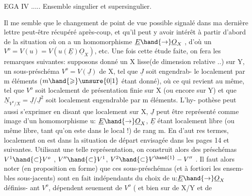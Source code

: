 
EGA IV ..... Ensemble singulier et supersingulier.

Il me semble que le changement de point de vue possible signalé dans ma
dernière lettre peut-être récupéré après-coup, et qu'il peut y avoir intérêt
à partir d'abord de la situation où on a  un homomorphisme $\underline{E}\hand{\to}\underline{O}_X$ , d'où
un $V^o = V(u) = V(u(\underline{E})\underline{O}_X)$, etc. Une fois cette étude faite, on fera les
remarques suivantes: supposons donné un X lisse(de dimension relative  ..)
sur Y, un sous-préschéma $V^o = V(\underline{J})$ de X, tel que $\underline{J}$ soit engendrab-%
le localement  par m éléments ($m\hand{\geqslant}\unsure{0|1}$ étant donné), où ce qui revient au
même, tel que $V^o$ soit localement de présentation finie sur X (ou encore sur
Y) et que  $\underline{N}_{V^o/X} = \underline{J}/\underline{J}^2$  soit localement engendrable par m éléments.  L'hy-%
pothèse peut aussi s'exprimer en disant que localement sur X, $\underline{J}$ peut être
représenté comme image d'un homomorphisme  u: $\underline{E}\hand{\to}\underline{O}_X$, $\underline{E}$ étant localement
libre (ou même libre, tant qu'on este dans le local !) de rang m.  En d'aut
res termes, localement on est dans la situation de départ envisagée dans
les pages 14 et suivantes. Utilisant une telle représentation, on construit
alors des préschémas  $V^1 \hand{\subset} V^o$ , $V'' \hand{\subset} V^1$, $V^2 \hand{\subset} V^{\hand{1}}-V''$ . Il faut alors noter
(en proposition en forme) que ces sous-préschémas (et à fortiori les ensem-%
bles sous-jacents) sont en fait indépendants du choix de u:$\underline{E}\hand{\to}\underline{O}_X$ définiss-%
ant $V^o$,   dépendent seuement de  $V^o$ ( et bien sur de X/Y et de
